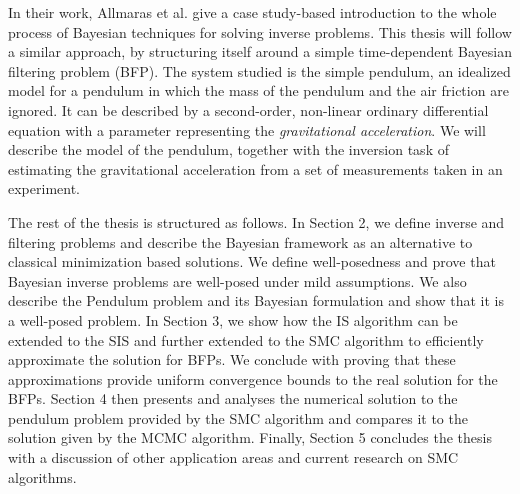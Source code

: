 In their work, Allmaras et al. \cite{bayes-tutorial} give a case study-based introduction to the whole process of Bayesian techniques for solving inverse problems. This thesis will follow a similar approach, by structuring itself around a simple time-dependent Bayesian filtering problem (BFP). The system studied is the simple pendulum, an idealized model for a pendulum in which the mass of the pendulum and the air friction are ignored. It can be described by a second-order, non-linear ordinary differential equation with a parameter representing the \textit{gravitational acceleration}. We will describe the model of the pendulum, together with the inversion task of estimating the gravitational acceleration from a set of measurements taken in an experiment. 

The rest of the thesis is structured as follows. In Section 2, we define inverse and filtering problems and describe the Bayesian framework as an alternative to classical minimization based solutions. We define well-posedness and prove that Bayesian inverse problems are well-posed under mild assumptions. We also describe the Pendulum problem and its Bayesian formulation and show that it is a well-posed problem. In Section 3, we show how the IS algorithm can be extended to the SIS and further extended to the SMC algorithm to efficiently approximate the solution for BFPs. We conclude with proving that these approximations provide uniform convergence bounds to the real solution for the BFPs. Section 4 then presents and analyses the numerical solution to the pendulum problem provided by the SMC algorithm and compares it to the solution given by the MCMC algorithm. Finally, Section 5 concludes the thesis with a discussion of other application areas and current research on SMC algorithms.

